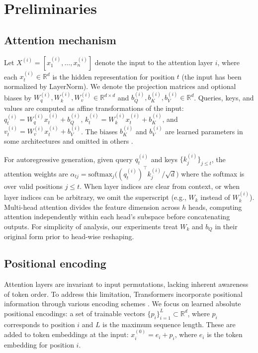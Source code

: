 \documentclass[11pt]{article}
\newif\ifYRMcomments
\newcommand{\YTODO}[1]{\ifYRMcomments\textcolor{pink}{[TODO for Yuval: #1]}\fi}
\newcommand{\YRM}[1]{\ifYRMcomments\textcolor{red}{[YRM: #1]}\fi}
\begin{document}
\section{Preliminaries}
\YTODO{Write about the input (the sentence we are using)}
\subsection{Attention mechanism}
Let $X^{(i)}=[x_1^{(i)},\ldots,x_n^{(i)}]$ denote the input to the attention layer $i$, where each $x_t^{(i)}\in\mathbb{R}^{d}$ is the hidden representation for position $t$ (the input has been normalized by LayerNorm). We denote the projection matrices and optional biases by $W_q^{(i)},W_k^{(i)},W_v^{(i)}\in\mathbb{R}^{d\times d}$ and $b_Q^{(i)},b_K^{(i)},b_V^{(i)}\in\mathbb{R}^{d}$. Queries, keys, and values are computed as affine transformations of the input: $q_t^{(i)}=W_q^{(i)}x_t^{(i)} + b_Q^{(i)}$, $k_t^{(i)}=W_k^{(i)}x_t^{(i)} + b_K^{(i)}$, and $v_t^{(i)}=W_v^{(i)}x_t^{(i)} + b_V^{(i)}$. The biases $b_K^{(i)}$ and $b_V^{(i)}$ are learned parameters in some architectures \cite{vaswani2017attention} and omitted in others \cite{touvron2023llama2}. \YRM{Verify and add more specific citations for bias usage patterns}

For autoregressive generation, given query $q_t^{(i)}$ and keys $\{k_j^{(i)}\}_{j\le t}$, the attention weights are $\alpha_{t j}=\mathrm{softmax}_j\!\big((q_t^{(i)})^\top k_j^{(i)} / \sqrt{d}\big)$ \YRM{I changed the transpose here to be on the Q, please make sure that OK (this is better for later). Make sure this changes fit all other places/notations)}where the softmax is over valid positions $j \le t$. When layer indices are clear from context, or when layer indices can be arbitrary, we omit the superscript (e.g., $W_k$ instead of $W_k^{(i)}$). Multi-head attention divides the feature dimension across $h$ heads, computing attention independently within each head's subspace before concatenating outputs. For simplicity of analysis, our experiments treat $W_k$ and $b_Q$ in their original form prior to head-wise reshaping.

\subsection{Positional encoding}
Attention layers are invariant to input permutations, lacking inherent awareness of token order. To address this limitation, Transformers incorporate positional information through various encoding schemes \YRM{Cite all in RW}. We focus on learned absolute positional encodings: a set of trainable vectors $\{p_i\}_{i=1}^{L} \subset \mathbb{R}^{d}$, where $p_i$ corresponds to position $i$ and $L$ is the maximum sequence length. These are added to token embeddings at the input: $x_i^{(0)} = e_i + p_i$, where $e_i$ is the token embedding for position $i$.
\end{document}
